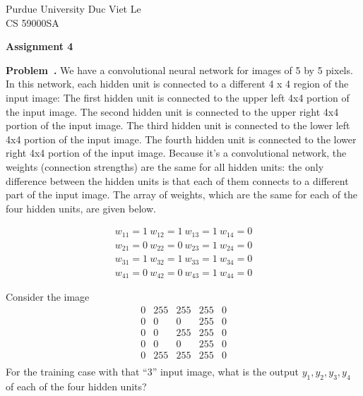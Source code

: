 \documentclass{article}
\newcommand{\dspace}{\baselineskip 16pt}
\newcommand{\sspace}{\baselineskip 14pt}
\newcounter{problem}[section]
\newenvironment{problem}[1][]{\refstepcounter{problem}\par\medskip
   \noindent \textbf{Problem~\theproblem. #1} \rmfamily}{\medskip}
\begin{document}
\sspace
\noindent
Purdue University \hfill Duc Viet Le\\
CS 59000SA        \hfill 
\dspace
\begin{center}
{\bf Assignment 4}
\end{center}
\vspace{.2in}
\begin{problem}
We have a convolutional neural network for images of 5 by 5 pixels. In this network, each hidden unit is connected to a different 4 x 4 region of the input image: The first hidden unit is connected to the upper left 4x4 portion of the input image. The second hidden unit is connected to the upper right 4x4 portion of the input image. The third hidden unit is connected to the lower left 4x4 portion of the input image. The fourth hidden unit is connected to the lower right 4x4 portion of the input image.
Because it’s a convolutional network, the weights (connection strengths) are the same for all hidden units:
the only difference between the hidden units is that each of them connects to a different part of the input
image. The array of weights, which are the same for each of the four hidden units, are given below. 

\begin{equation*}
    \begin{array}{cccc}
        w_{11} = 1~w_{12} = 1~w_{13} = 1~w_{14} = 0\\
        w_{21} = 0~w_{22} = 0~w_{23} = 1~w_{24} = 0\\
        w_{31} = 1~w_{32} = 1~w_{33} = 1~w_{34} = 0\\
        w_{41} = 0~w_{42} = 0~w_{43} = 1~w_{44} = 0
    \end{array}
\end{equation*}

Consider the image
\begin{equation*}
    \begin{array}{ccccc}
        0 &255 &255 &255 &0\\
        0 &0   &0   &255 &0\\
        0 &0   &255 &255 &0\\
        0 &0   &0   &255 &0\\
        0 &255 &255 &255 &0\\
    \end{array}
\end{equation*}
For the training case with that ``3'' input image, what is the output $y_1, y_2, y_3, y_4$ of each of the four hidden
units?
\end{problem}
\end{document}
